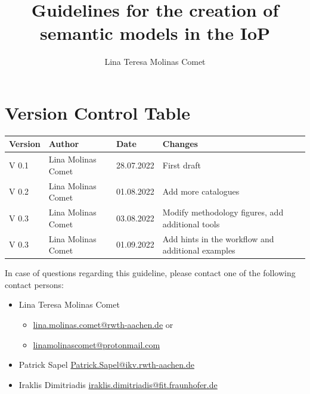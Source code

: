 \documentclass{guideline/sty/rapport}
\title{Guidelines for the creation of semantic models in the IoP}
\author{
	Lina Teresa Molinas Comet
}
\begin{document}
 

\maketitle

\section*{Version Control Table}
\begin{table}[H]
	\centering
	\begin{tabular}{L{.09\textwidth} L{.25\textwidth} L{.10\textwidth}  L{.40\textwidth}}
		\hline
		\textbf{Version} & \textbf{Author} & \textbf{Date} & \textbf{Changes}  \\
		\hline
		V 0.1 & Lina Molinas Comet & 28.07.2022 & First draft \\
		V 0.2 & Lina Molinas Comet & 01.08.2022 & Add more catalogues \\
		V 0.3 & Lina Molinas Comet & 03.08.2022 & Modify methodology figures, add additional tools \\
		V 0.3 & Lina Molinas Comet & 01.09.2022 & Add hints in the workflow and additional examples \\
		\hline
	\end{tabular}
\end{table}

In case of questions regarding this guideline, please contact one of the following contact persons: \singlespacing
\begin{itemize}
	\item Lina Teresa Molinas Comet
	\begin{itemize}
			\item \href{mailto:lina.molinas.comet@rwth-aachen.de}{lina.molinas.comet@rwth-aachen.de} or  
			\item \href{mailto:linamolinascomet@protonmail.com}{linamolinascomet@protonmail.com} 
		\end{itemize}
	\item Patrick Sapel \href{mailto:Patrick.Sapel@ikv.rwth-aachen.de}{Patrick.Sapel@ikv.rwth-aachen.de}
    \item Iraklis Dimitriadis \href{mailto:iraklis.dimitriadis@fit.fraunhofer.de}{iraklis.dimitriadis@fit.fraunhofer.de}
\end{itemize}


\sloppy  
\end{document}
